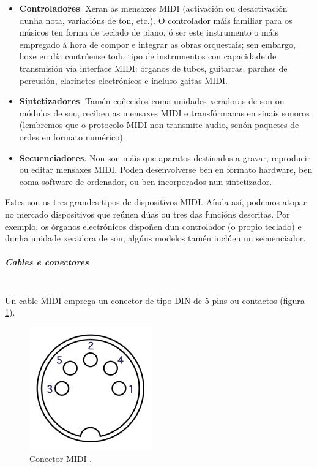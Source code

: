     \begin{itemize}
     \item \textbf{Controladores}. Xeran as mensaxes MIDI (activación ou
           desactivación dunha nota, variacións de ton, etc.). O controlador
           máis familiar para os músicos ten forma de teclado de piano, ó ser
           este instrumento o máis empregado á hora de compor e integrar as
           obras orquestais; sen embargo, hoxe en día contrúense todo tipo de
           instrumentos con capacidade de transmisión vía interface MIDI:
           órganos de tubos, guitarras, parches de percusión, clarinetes
           electrónicos e incluso gaitas MIDI.
     \item \textbf{Sintetizadores}. Tamén coñecidos coma unidades xeradoras de
           son ou módulos de son, reciben as mensaxes MIDI e transfórmanas en
           sinais sonoros (lembremos que o protocolo MIDI non transmite audio,
           senón paquetes de ordes en formato numérico).
     \item \textbf{Secuenciadores}. Non son máis que aparatos destinados a
           gravar, reproducir ou editar mensaxes MIDI. Poden desenvolverse ben
           en formato hardware, ben coma software de ordenador, ou ben
           incorporados nun sintetizador.
    \end{itemize}

    Estes son os tres grandes tipos de dispositivos MIDI. Aínda así, podemos
    atopar no mercado dispositivos que reúnen dúas ou tres das funcións
    descritas. Por exemplo, os órganos electrónicos dispoñen dun controlador (o
    propio teclado) e dunha unidade xeradora de son; algúns modelos tamén
    inclúen un secuenciador.

    \subparagraph{Cables e conectores}\mbox{}\\

    Un cable MIDI emprega un conector de tipo DIN de 5 pins ou contactos
    (figura \ref{figura:WikipediaConectorMIDI}).

    \begin{figure}[htbp]
     \centering
     \includegraphics[scale=0.5,keepaspectratio=true]{./imagenes/wikipedia-conector-midi.png}
     \caption[Conector MIDI]{Conector MIDI \cite{WikipediaMIDI}.}
     \label{figura:WikipediaConectorMIDI}
    \end{figure}

